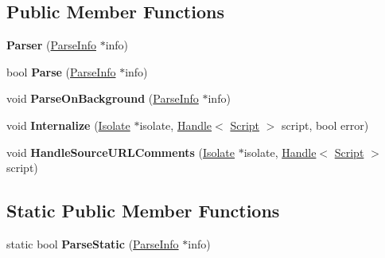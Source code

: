 \subsection*{Public Member Functions}
\begin{DoxyCompactItemize}
\item 
{\bfseries Parser} (\hyperlink{classv8_1_1internal_1_1_parse_info}{Parse\+Info} $\ast$info)\hypertarget{classv8_1_1internal_1_1_parser_a381ef18980cfd4edc5a94320f3ffdb56}{}\label{classv8_1_1internal_1_1_parser_a381ef18980cfd4edc5a94320f3ffdb56}

\item 
bool {\bfseries Parse} (\hyperlink{classv8_1_1internal_1_1_parse_info}{Parse\+Info} $\ast$info)\hypertarget{classv8_1_1internal_1_1_parser_a2dd2481b8a269cee072676c07940d98c}{}\label{classv8_1_1internal_1_1_parser_a2dd2481b8a269cee072676c07940d98c}

\item 
void {\bfseries Parse\+On\+Background} (\hyperlink{classv8_1_1internal_1_1_parse_info}{Parse\+Info} $\ast$info)\hypertarget{classv8_1_1internal_1_1_parser_a52beadf837b1240bdfd58b814082b96d}{}\label{classv8_1_1internal_1_1_parser_a52beadf837b1240bdfd58b814082b96d}

\item 
void {\bfseries Internalize} (\hyperlink{classv8_1_1internal_1_1_isolate}{Isolate} $\ast$isolate, \hyperlink{classv8_1_1internal_1_1_handle}{Handle}$<$ \hyperlink{classv8_1_1internal_1_1_script}{Script} $>$ script, bool error)\hypertarget{classv8_1_1internal_1_1_parser_a9ec9934e8b9b113c49b4fa00ef0654f6}{}\label{classv8_1_1internal_1_1_parser_a9ec9934e8b9b113c49b4fa00ef0654f6}

\item 
void {\bfseries Handle\+Source\+U\+R\+L\+Comments} (\hyperlink{classv8_1_1internal_1_1_isolate}{Isolate} $\ast$isolate, \hyperlink{classv8_1_1internal_1_1_handle}{Handle}$<$ \hyperlink{classv8_1_1internal_1_1_script}{Script} $>$ script)\hypertarget{classv8_1_1internal_1_1_parser_ae26011456d1b1a5cc4e2f70f1d5396b6}{}\label{classv8_1_1internal_1_1_parser_ae26011456d1b1a5cc4e2f70f1d5396b6}

\end{DoxyCompactItemize}
\subsection*{Static Public Member Functions}
\begin{DoxyCompactItemize}
\item 
static bool {\bfseries Parse\+Static} (\hyperlink{classv8_1_1internal_1_1_parse_info}{Parse\+Info} $\ast$info)\hypertarget{classv8_1_1internal_1_1_parser_a63318823bbc13c29f621e3d1d9d6a416}{}\label{classv8_1_1internal_1_1_parser_a63318823bbc13c29f621e3d1d9d6a416}

\end{DoxyCompactItemize}
